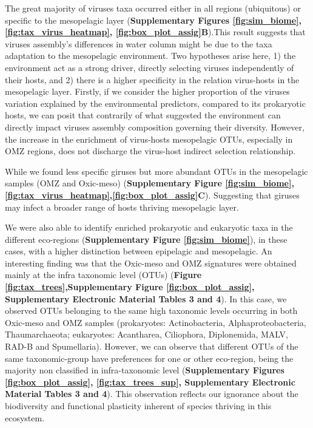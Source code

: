 \documentclass[fleqn,10pt]{wlscirep}
\begin{document}
The great majority of viruses taxa occurred either in all regions (ubiquitous) or specific to the mesopelagic layer (\textbf{Supplementary Figures \ref{fig:sim_biome}, \ref{fig:tax_virus_heatmap}, \ref{fig:box_plot_assig}B}).This result suggests that viruses assembly's differences in water column might be due to the taxa adaptation to the mesopelagic environment. Two hypotheses arise here, 1) the environment act as a strong driver, directly selecting viruses independently of their hosts, and 2) there is a higher specificity in the relation virus-hosts in the mesopelagic layer. Firstly, if we consider the higher proportion of the viruses variation explained by the environmental predictors, compared to its prokaryotic hosts, we can posit that contrarily of what suggested the environment can directly impact viruses assembly composition governing their diversity. However, the increase in the enrichment of virus-hosts mesopelagic OTUs, especially in OMZ regions, does not discharge the virus-host indirect selection relationship.

While we found less specific giruses but more abundant OTUs in the mesopelagic samples (OMZ and Oxic-meso) (\textbf{Supplementary Figure \ref{fig:sim_biome}, \ref{fig:tax_virus_heatmap},\ref{fig:box_plot_assig}C}). Suggesting that giruses may infect a broader range of hosts thriving mesopelagic layer.

We were also able to identify enriched prokaryotic and eukaryotic taxa in the different eco-regions (\textbf{Supplementary Figure \ref{fig:sim_biome}}), in these cases, with a higher distinction between epipelagic and mesopelagic. An interesting finding was that the Oxic-meso and OMZ signatures were obtained mainly at the infra taxonomic level (OTUs) (\textbf{Figure \ref{fig:tax_trees},Supplementary Figure \ref{fig:box_plot_assig}, Supplementary Electronic Material Tables 3 and 4}). In this case, we observed OTUs belonging to the same high taxonomic levels occurring in both Oxic-meso and OMZ samples (prokaryotes: Actinobacteria, Alphaproteobacteria, Thaumarchaeota; eukaryotes: Acantharea, Ciliophora, Diplonemida, MALV, RAD-B and Spumellaria). However, we can observe that different OTUs of the same taxonomic-group have preferences for one or other eco-region, being the majority non classified in infra-taxonomic level (\textbf{Supplementary Figures \ref{fig:box_plot_assig}, \ref{fig:tax_trees_sup}, Supplementary Electronic Material Tables 3 and 4}). This observation reflects our ignorance about the biodiversity and functional plasticity inherent of species thriving in this ecosystem.
\end{document}

